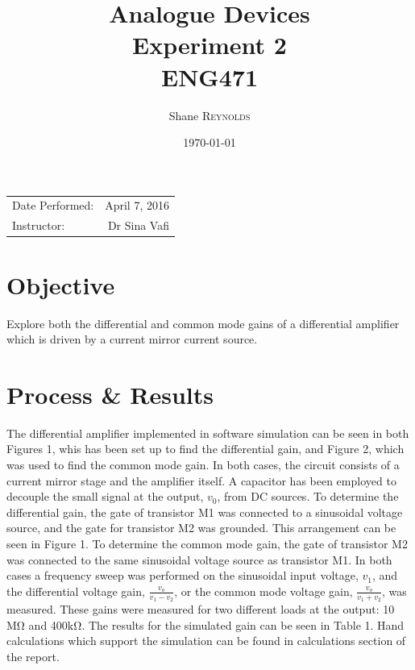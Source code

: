 \documentclass{article}
\title{Analogue Devices \\ Experiment 2 \\ ENG471} %
\author{Shane \textsc{Reynolds}} %
\date{\today} %
\begin{document}
\maketitle %

\begin{center}
\begin{tabular}{l r}
Date Performed: & April 7, 2016 \\ %
Instructor: & Dr Sina Vafi %
\end{tabular}
\end{center}



\section{Objective}

Explore both the differential and common mode gains of a differential amplifier which is driven by  a current mirror current source.


\section{Process \& Results}

The differential amplifier implemented in software simulation can be seen in both Figures 1, whis has been set up to find the differential gain, and Figure 2, which was used to find the common mode gain. In both cases, the circuit consists of a current mirror stage and the amplifier itself. A capacitor has been employed to decouple the small signal at the output, $v_0$, from DC sources. To determine the differential gain, the gate of transistor M1 was connected to a sinusoidal voltage source, and the gate for transistor M2 was grounded. This arrangement can be seen in Figure 1. To determine the common mode gain, the gate of transistor M2 was connected to the same sinusoidal voltage source as transistor M1. In both cases a frequency sweep was performed on the sinusoidal input voltage, $v_1$, and the differential voltage gain, $\frac{v_o}{v_1 - v_2}$, or the common mode voltage gain, $\frac{v_o}{v_1 + v_2}$, was measured. These gains were measured for two different loads at the output: 10$\si{\mega\ohm}$ and 400$\si{\kilo\ohm}$. The results for the simulated gain can be seen in Table 1. Hand calculations which support the simulation can be found in calculations section of the report.
\end{document}
